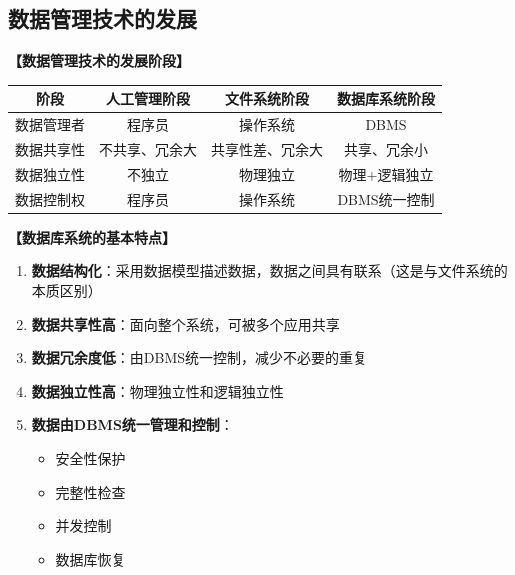 \documentclass[12pt, a4paper]{article}
\newenvironment{bluebox}[1]{%
  \begin{trivlist}
  \item[\hskip\labelsep \textbf{#1}]
  \setlength{\parskip}{0.5ex}
  \setlength{\itemsep}{0.5ex}
}{%
  \end{trivlist}
}
\begin{document}
\subsection{数据管理技术的发展}

\begin{bluebox}{发展阶段}
	\textbf{【数据管理技术的发展阶段】}

	\begin{tabular}{|c|c|c|c|}
		\hline
		\textbf{阶段} & \textbf{人工管理阶段} & \textbf{文件系统阶段} & \textbf{数据库系统阶段} \\
		\hline
		数据管理者       & 程序员             & 操作系统            & DBMS             \\
		\hline
		数据共享性       & 不共享、冗余大         & 共享性差、冗余大        & 共享、冗余小           \\
		\hline
		数据独立性       & 不独立             & 物理独立            & 物理+逻辑独立          \\
		\hline
		数据控制权       & 程序员             & 操作系统            & DBMS统一控制         \\
		\hline
	\end{tabular}
\end{bluebox}

\begin{bluebox}{数据库系统特点}
	\textbf{【数据库系统的基本特点】}

	\begin{enumerate}[leftmargin=*, label=\textbf{\arabic*.}]
		\item \textbf{数据结构化}：采用数据模型描述数据，数据之间具有联系（这是与文件系统的本质区别）
		\item \textbf{数据共享性高}：面向整个系统，可被多个应用共享
		\item \textbf{数据冗余度低}：由DBMS统一控制，减少不必要的重复
		\item \textbf{数据独立性高}：物理独立性和逻辑独立性
		\item \textbf{数据由DBMS统一管理和控制}：
		      \begin{itemize}
			      \item 安全性保护
			      \item 完整性检查
			      \item 并发控制
			      \item 数据库恢复
		      \end{itemize}
	\end{enumerate}
\end{bluebox}
\end{document}
